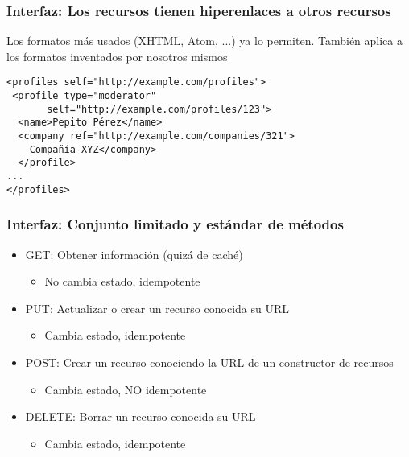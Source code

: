 \begin{frame}[fragile]
\frametitle{Interfaz: Los recursos tienen hiperenlaces a otros recursos}

Los formatos más usados (XHTML, Atom, ...) ya lo permiten.
También aplica a los formatos inventados por nosotros mismos

\begin{verbatim}
<profiles self="http://example.com/profiles">
 <profile type="moderator" 
       self="http://example.com/profiles/123">
  <name>Pepito Pérez</name>
  <company ref="http://example.com/companies/321">
    Compañía XYZ</company>
  </profile>
...
</profiles>
\end{verbatim}

\end{frame}


\begin{frame}
\frametitle{Interfaz: Conjunto limitado y estándar de métodos}

\begin{itemize}
\item GET:  Obtener información (quizá de caché)
  \begin{itemize}
  \item No cambia estado, idempotente
  \end{itemize}
\item PUT: Actualizar o crear un recurso conocida su URL 
  \begin{itemize}
  \item Cambia estado, idempotente
  \end{itemize}
\item POST: Crear un recurso conociendo la URL de un constructor de recursos
  \begin{itemize}
  \item Cambia estado, NO idempotente
  \end{itemize}
\item DELETE: Borrar un recurso conocida su URL
  \begin{itemize}
  \item Cambia estado, idempotente
  \end{itemize}
\end{itemize}

\end{frame}


